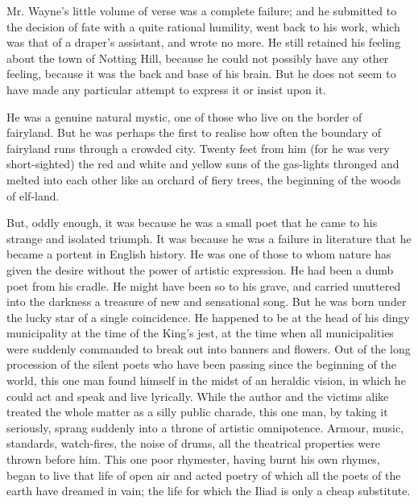 \documentclass{book}
\begin{document}
Mr. Wayne’s little volume of verse was a complete failure; and he submitted to the decision of fate with a quite rational humility, went back to his work, which was that of a draper’s assistant, and wrote no more. He still retained his feeling about the town of Notting Hill, because he could not possibly have any other feeling, because it was the back and base of his brain. But he does not seem to have made any particular attempt to express it or insist upon it.

He was a genuine natural mystic, one of those who live on the border of fairyland. But he was perhaps the first to realise how often the boundary of fairyland runs through a crowded city. Twenty feet from him (for he was very short-sighted) the red and white and yellow suns of the gas-lights thronged and melted into each other like an orchard of fiery trees, the beginning of the woods of elf-land.

But, oddly enough, it was because he was a small poet that he came to his strange and isolated triumph. It was because he was a failure in literature that he became a portent in English history. He was one of those to whom nature has given the desire without the power of artistic expression. He had been a dumb poet from his cradle. He might have been so to his grave, and carried unuttered into the darkness a treasure of new and sensational song. But he was born under the lucky star of a single coincidence. He happened to be at the head of his dingy municipality at the time of the King’s jest, at the time when all municipalities were suddenly commanded to break out into banners and flowers. Out of the long procession of the silent poets who have been passing since the beginning of the world, this one man found himself in the midst of an heraldic vision, in which he could act and speak and live lyrically. While the author and the victims alike treated the whole matter as a silly public charade, this one man, by taking it seriously, sprang suddenly into a throne of artistic omnipotence. Armour, music, standards, watch-fires, the noise of drums, all the theatrical properties were thrown before him. This one poor rhymester, having burnt his own rhymes, began to live that life of open air and acted poetry of which all the poets of the earth have dreamed in vain; the life for which the Iliad is only a cheap substitute.
\end{document}
